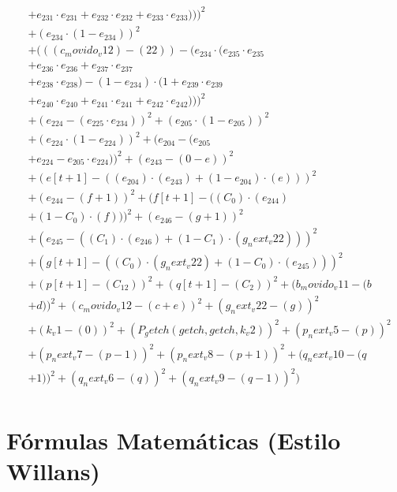 \documentclass[10pt, a4paper]{article}
\begin{document}
\begin{small}
\begin{align*}
& + e_{231} \cdot e_{231} + e_{232} \cdot e_{232} + e_{233} \cdot e_{233})))^{2} \\
& + (e_{234} \cdot (1 - e_{234}))^{2} \\
& + (((c_movido_v12) - (22)) - (e_{234} \cdot (e_{235} \cdot e_{235} \\
& + e_{236} \cdot e_{236} + e_{237} \cdot e_{237} \\
& + e_{238} \cdot e_{238}) - (1 - e_{234}) \cdot (1 + e_{239} \cdot e_{239} \\
& + e_{240} \cdot e_{240} + e_{241} \cdot e_{241} + e_{242} \cdot e_{242})))^{2} \\
& + (e_{224} - (e_{225} \cdot e_{234}))^{2} + (e_{205} \cdot (1 - e_{205}))^{2} \\
& + (e_{224} \cdot (1 - e_{224}))^{2} + (e_{204} - (e_{205} \\
& + e_{224} - e_{205} \cdot e_{224}))^{2} + (e_{243} - (0 - e))^{2} \\
& + (e[t+1] - ((e_{204})  \cdot  (e_{243}) + (1 - e_{204})  \cdot  (e)))^{2} \\
& + (e_{244} - (f + 1))^{2} + (f[t+1] - ((C_{0})  \cdot  (e_{244}) \\
& + (1 - C_{0})  \cdot  (f)))^{2} + (e_{246} - (g + 1))^{2} \\
& + (e_{245} - ((C_{1})  \cdot  (e_{246}) + (1 - C_{1})  \cdot  (g_next_v22)))^{2} \\
& + (g[t+1] - ((C_{0})  \cdot  (g_next_v22) + (1 - C_{0})  \cdot  (e_{245})))^{2} \\
& + (p[t+1] - (C_{12}))^{2} + (q[t+1] - (C_{2}))^{2} + (b_movido_v11 - (b \\
& + d))^{2} + (c_movido_v12 - (c + e))^{2} + (g_next_v22 - (g))^{2} \\
& + (k_v1 - (0))^{2} + (P_getch(getch, getch, k_v2))^{2} + (p_next_v5 - (p))^{2} \\
& + (p_next_v7 - (p - 1))^{2} + (p_next_v8 - (p + 1))^{2} + (q_next_v10 - (q \\
& + 1))^{2} + (q_next_v6 - (q))^{2} + (q_next_v9 - (q - 1))^{2}) \\
\end{align*}
\end{small}\part{Fórmulas Matemáticas (Estilo Willans)}
\end{document}
